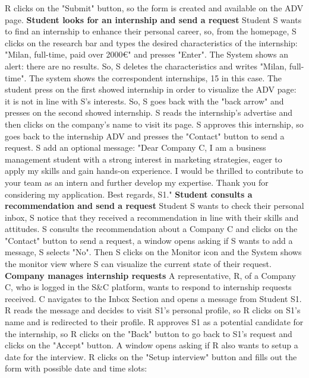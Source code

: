 R clicks on the "Submit" button, so the form is created and available on the ADV page. 
\newline\newline
\textbf{Student looks for an internship and send a request}
\newline
Student S wants to find an internship to enhance their personal career, so, from the homepage, S clicks on the research bar and types the desired characteristics of the internship: "Milan, full-time, paid over 2000€" and presses "Enter". The System shows an alert: there are no results. So, S deletes the characteristics and writes "Milan, full-time". The system shows the correspondent internships, 15 in this case. The student press on the first showed internship in order to visualize the ADV page: it is not in line with S's interests. So, S goes back with the "back arrow" and presses on the second showed internship. S reads the internship's advertise and then clicks on the company's name to visit its page. S approves this internship, so goes back to the internship ADV and presses the "Contact" button to send a request. S add an optional message: "Dear Company C, I am a business management student with a strong interest in marketing strategies, eager to apply my skills and gain hands-on experience. I would be thrilled to contribute to your team as an intern and further develop my expertise. Thank you for considering my application. Best regards, S1."
\newline\newline
\textbf{Student consults a recommendation and send a request}
\newline
Student S wants to check their personal inbox, S notice that they received a recommendation in line with their skills and attitudes. S consults the recommendation about a Company C and clicks on the "Contact" button to send a request, a window opens asking if S wants to add a message, S selects "No". Then S clicks on the Monitor icon and the System shows the monitor view where S can visualize the current state of their request.
\newline\newline
\textbf{Company manages internship requests}\newline
A representative, R, of a Company C, who is logged in the S\&C platform, wants to respond to internship requests received. C navigates to the Inbox Section and opens a message from Student S1. R reads the message and decides to visit S1's personal profile, so R clicks on S1's name and is redirected to their profile. R approves S1 as a potential candidate for the internship, so R clicks on the "Back" button to go back to S1's request and clicks on the "Accept" button. A window opens asking if R also wants to setup a date for the interview. R clicks on the "Setup interview" button and fills out the form with possible date and time slots:

